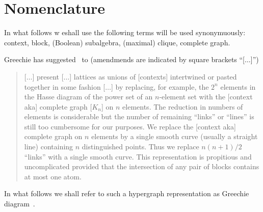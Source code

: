 \documentclass[%
  reprint,
  twocolumn,
 showpacs,
 showkeys,
 preprintnumbers,
 amsmath,amssymb,
 aps,
 pra,
  longbibliography,
 ]{revtex4-1}
\begin{document}

\setcounter{MaxMatrixCols}{20}

\section{Nomenclature}

In what follows w eshall use the following terms will be used synonymuously:
context, block, (Boolean) subalgebra, (maximal) clique, complete graph.

Greechie has suggested~\cite{greechie:71} to (amendmends are indicated by square brackets ``[$\ldots$]'')
\begin{quote}
[$\ldots$]
present [$\ldots$] lattices as unions of [contexts]
intertwined or pasted together in some fashion
[$\ldots$]
by replacing, for example, the $2^n$ elements in the Hasse diagram of the power set
of an $n$-element set with the [context aka] complete graph [$K_n$] on $n$ elements.
The reduction in numbers of elements is considerable but the number of remaining ``links''
or ``lines'' is still too cumbersome for our purposes.
We replace the [context aka] complete graph on $n$ elements by a single smooth curve (usually a straight line)
containing $n$ distinguished points. Thus we replace $n(n + 1)/2$ ``links'' with a single smooth curve.
This representation is propitious and uncomplicated provided that
the intersection of any pair of blocks contains at most one atom.
\end{quote}
In what follows we shall refer to such a hypergraph representation as {Greechie diagram}~\cite{kalmbach-83}.
\end{document}
